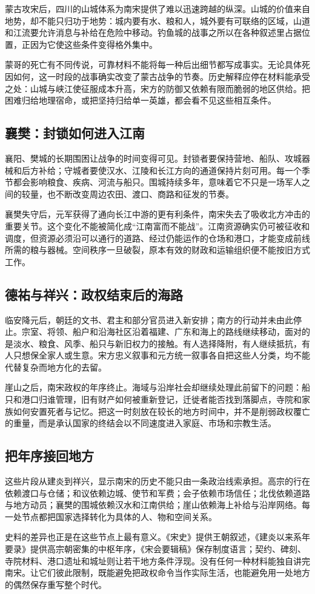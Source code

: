 蒙古攻宋后，四川的山城体系为南宋提供了难以迅速跨越的纵深。山城的价值来自地势，却不能只归功于地势：城内要有水、粮和人，城外要有可联络的区域，山道和江流要允许消息与补给在危险中移动。钓鱼城的战事之所以在各种叙述里占据位置，正因为它使这些条件变得格外集中。

蒙哥的死亡有不同传说，可靠材料不能将每一种后出细节都写成事实。无论具体死因如何，这一时段的战事确实改变了蒙古战争的节奏。历史解释应停在材料能承受之处：山城与峡江使征服成本升高，宋方的防御又依赖有限而脆弱的地区供给。把困难归给地理宿命，或把坚持归给单一英雄，都会看不见这些相互条件。

\subsection{襄樊：封锁如何进入江南}

襄阳、樊城的长期围困让战争的时间变得可见。封锁者要保持营地、船队、攻城器械和后方补给；守城者要使汉水、江陵和长江方向的通道保持片刻可用。每一个季节都会影响粮食、疾病、河流与船只。围城持续多年，意味着它不只是一场军人之间的较量，也不断改变周边农田、渡口、商路和征发的节奏。

襄樊失守后，元军获得了通向长江中游的更有利条件，南宋失去了吸收北方冲击的重要关节。这个变化不能被简化成“江南富而不能战”。江南资源确实仍可被征收和调度，但资源必须沿可以通行的道路、经过仍能运作的仓场和港口，才能变成前线所需的粮与器械。空间秩序一旦破裂，原本有效的财政和运输组织便不能按旧方式工作。

\subsection{德祐与祥兴：政权结束后的海路}

临安降元后，朝廷的文书、君主和部分官员进入新安排；南方的行动并未由此停止。宗室、将领、船户和沿海社区沿着福建、广东和海上的路线继续移动，面对的是淡水、粮食、风季、船只与新旧权力的接触。有人选择降附，有人继续抵抗，有人只想保全家人或生意。宋方忠义叙事和元方统一叙事各自把这些人分类，均不能代替复杂而地方化的去留。

崖山之后，南宋政权的年序终止。海域与沿岸社会却继续处理此前留下的问题：船只和港口归谁管理，旧有财产如何被重新登记，迁徙者能否找到落脚点，寺院和家族如何安置死者与记忆。把这一时刻放在较长的地方时间中，并不是削弱政权覆亡的重量，而是承认国家的终结会以不同速度进入家庭、市场和宗教生活。

\subsection{把年序接回地方}

这些片段从建炎到祥兴，显示南宋的历史不能只由一条政治线索承担。高宗的行在依赖渡口与仓储；和议依赖边城、使节和军费；会子依赖市场信任；北伐依赖道路与地方动员；襄樊的围城依赖汉水和江南供给；崖山依赖海上补给与沿岸网络。每一处节点都把国家选择转化为具体的人、物和空间关系。

史料的差异也正是在这些节点上最有意义。《宋史》提供王朝叙述，《建炎以来系年要录》提供高宗朝密集的中枢年序，《宋会要辑稿》保存制度语言；契约、碑刻、寺院材料、港口遗址和城址则让若干地方条件浮现。没有任何一种材料能独自讲完南宋。让它们彼此限制，既能避免把政权命令当作实际生活，也能避免用一处地方的偶然保存重写整个时代。
